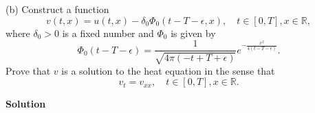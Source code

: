 \documentclass{article}
\begin{document}
\vspace{5mm}

(b) Construct a function
%
\begin{equation*}
    v(t, x) = u(t, x) - \delta_0 \Phi_0(t - T - \epsilon, x),
    \quad t \in [0, T], x \in \mathbb{R}
    ,
\end{equation*}
%
where $\delta_0 > 0$ is a fixed number and $\Phi_0$ is given by
%
\begin{equation*}
    \Phi_0(t - T - \epsilon)
        = \frac{1}{\sqrt{4 \pi (- t + T + \epsilon)}}
            e^{- \frac{x^2}{4 (t - T - \epsilon)}}
        .
\end{equation*}
%
Prove that $v$ is a solution to the heat equation in the sense that
%
\begin{equation*}
    v_t = v_{xx},
    \quad t \in [0, T], x \in \mathbb{R}
    .
\end{equation*}

\textbf{Solution}
\end{document}
